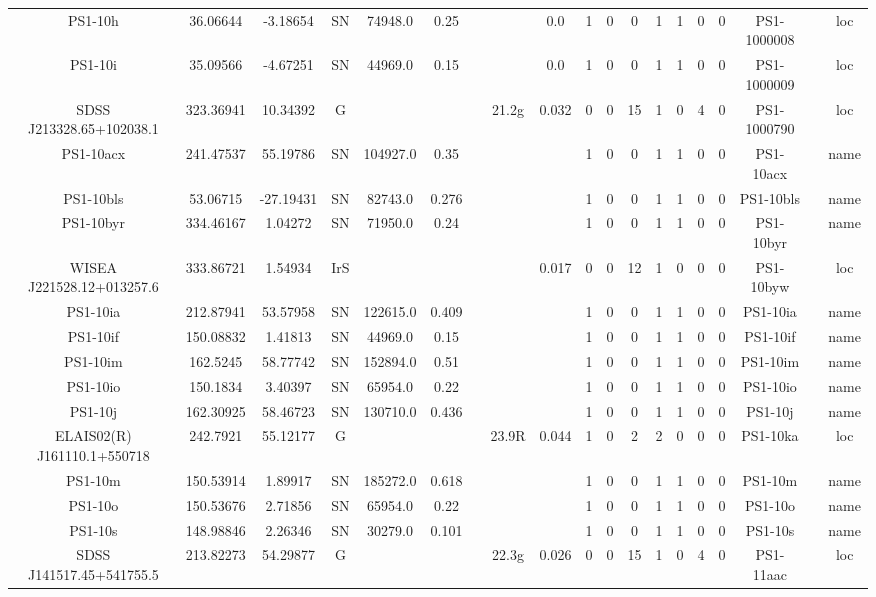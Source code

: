 \begin{table}
\begin{tabular}{ccccccccccccccccccc}
PS1-10h & 36.06644 & -3.18654 & SN & 74948.0 & 0.25 &  &  & 0.0 & 1 & 0 & 0 & 1 & 1 & 0 & 0 & PS1-1000008 &  & loc \\
PS1-10i & 35.09566 & -4.67251 & SN & 44969.0 & 0.15 &  &  & 0.0 & 1 & 0 & 0 & 1 & 1 & 0 & 0 & PS1-1000009 &  & loc \\
SDSS J213328.65+102038.1 & 323.36941 & 10.34392 & G &  &  &  & 21.2g & 0.032 & 0 & 0 & 15 & 1 & 0 & 4 & 0 & PS1-1000790 &  & loc \\
PS1-10acx & 241.47537 & 55.19786 & SN & 104927.0 & 0.35 &  &  &  & 1 & 0 & 0 & 1 & 1 & 0 & 0 & PS1-10acx &  & name \\
PS1-10bls & 53.06715 & -27.19431 & SN & 82743.0 & 0.276 &  &  &  & 1 & 0 & 0 & 1 & 1 & 0 & 0 & PS1-10bls &  & name \\
PS1-10byr & 334.46167 & 1.04272 & SN & 71950.0 & 0.24 &  &  &  & 1 & 0 & 0 & 1 & 1 & 0 & 0 & PS1-10byr &  & name \\
WISEA J221528.12+013257.6 & 333.86721 & 1.54934 & IrS &  &  &  &  & 0.017 & 0 & 0 & 12 & 1 & 0 & 0 & 0 & PS1-10byw &  & loc \\
PS1-10ia & 212.87941 & 53.57958 & SN & 122615.0 & 0.409 &  &  &  & 1 & 0 & 0 & 1 & 1 & 0 & 0 & PS1-10ia &  & name \\
PS1-10if & 150.08832 & 1.41813 & SN & 44969.0 & 0.15 &  &  &  & 1 & 0 & 0 & 1 & 1 & 0 & 0 & PS1-10if &  & name \\
PS1-10im & 162.5245 & 58.77742 & SN & 152894.0 & 0.51 &  &  &  & 1 & 0 & 0 & 1 & 1 & 0 & 0 & PS1-10im &  & name \\
PS1-10io & 150.1834 & 3.40397 & SN & 65954.0 & 0.22 &  &  &  & 1 & 0 & 0 & 1 & 1 & 0 & 0 & PS1-10io &  & name \\
PS1-10j & 162.30925 & 58.46723 & SN & 130710.0 & 0.436 &  &  &  & 1 & 0 & 0 & 1 & 1 & 0 & 0 & PS1-10j &  & name \\
ELAIS02(R) J161110.1+550718 & 242.7921 & 55.12177 & G &  &  &  & 23.9R & 0.044 & 1 & 0 & 2 & 2 & 0 & 0 & 0 & PS1-10ka &  & loc \\
PS1-10m & 150.53914 & 1.89917 & SN & 185272.0 & 0.618 &  &  &  & 1 & 0 & 0 & 1 & 1 & 0 & 0 & PS1-10m &  & name \\
PS1-10o & 150.53676 & 2.71856 & SN & 65954.0 & 0.22 &  &  &  & 1 & 0 & 0 & 1 & 1 & 0 & 0 & PS1-10o &  & name \\
PS1-10s & 148.98846 & 2.26346 & SN & 30279.0 & 0.101 &  &  &  & 1 & 0 & 0 & 1 & 1 & 0 & 0 & PS1-10s &  & name \\
SDSS J141517.45+541755.5 & 213.82273 & 54.29877 & G &  &  &  & 22.3g & 0.026 & 0 & 0 & 15 & 1 & 0 & 4 & 0 & PS1-11aac &  & loc \\

\end{tabular}
\end{table}
